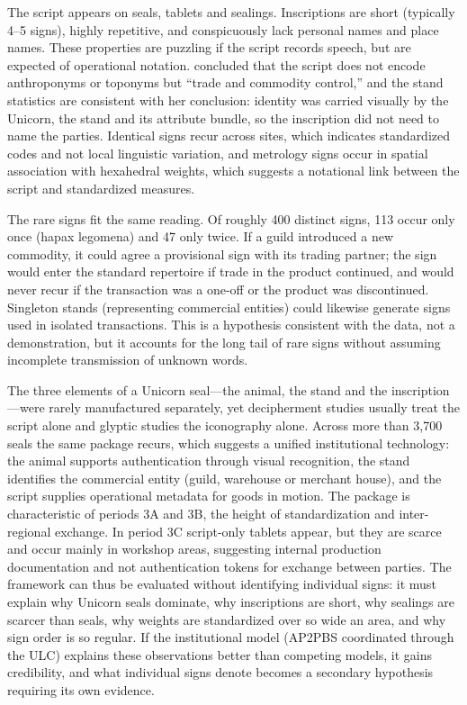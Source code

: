 \documentclass[12pt]{article}
\begin{document}
The script appears on seals, tablets and sealings. Inscriptions are short
(typically 4--5 signs), highly repetitive, and conspicuously lack personal names
and place names. These properties are puzzling if the script records speech, but
are expected of operational notation. \citet{mukhopadhyay2023} concluded that the
script does not encode anthroponyms or toponyms but ``trade and commodity
control,'' and the stand statistics are consistent with her conclusion: identity
was carried visually by the Unicorn, the stand and its attribute bundle, so
the inscription did not need to name the parties. Identical signs recur across
sites, which indicates standardized codes and not local linguistic variation, and
metrology signs occur in spatial association with hexahedral weights, which
suggests a notational link between the script and standardized measures.

The rare signs fit the same reading. Of roughly 400 distinct signs, 113 occur
only once (hapax legomena) and 47 only twice. If a guild introduced a new
commodity, it could agree a provisional sign with its trading partner; the sign
would enter the standard repertoire if trade in the product continued, and would
never recur if the transaction was a one-off or the product was discontinued.
Singleton stands (representing commercial entities) could likewise generate signs
used in isolated transactions.  This is a hypothesis consistent with the data, not
a demonstration, but it accounts for the long tail of rare signs without assuming
incomplete transmission of unknown words.

The three elements of a Unicorn seal---the animal, the stand and the
inscription---were rarely manufactured separately, yet decipherment studies
usually treat the script alone and glyptic studies the iconography alone. Across
more than 3,700 seals the same package recurs, which suggests a unified
institutional technology: the animal supports authentication through visual
recognition, the stand identifies the commercial entity (guild, warehouse or
merchant house), and the script supplies operational metadata for goods in
motion. The package is characteristic of periods 3A and 3B, the height of
standardization and inter-regional exchange. In period 3C script-only tablets
appear, but they are scarce and occur mainly in workshop areas, suggesting
internal production documentation and not authentication tokens for exchange
between parties. The framework can thus be evaluated without identifying
individual signs: it must explain why Unicorn seals dominate, why inscriptions
are short, why sealings are scarcer than seals, why weights are standardized over
so wide an area, and why sign order is so regular. If the institutional model
(AP2PBS coordinated through the ULC) explains these observations better than
competing models, it gains credibility, and what individual signs denote becomes
a secondary hypothesis requiring its own evidence.
\end{document}
